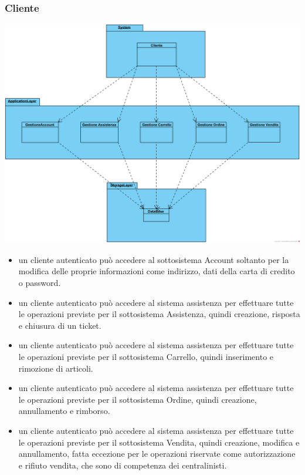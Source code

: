 \documentclass[12pt,a4paper]{article}
\begin{document}
\newpage

\subsubsection{Cliente}
\begin{center}
\includegraphics[height=0.34\textheight]{Cliente}
\end{center}
\begin{itemize}
\item un cliente autenticato può accedere al sottosistema Account soltanto per la modifica delle proprie informazioni come indirizzo, dati della carta di credito o password.
\item un cliente autenticato può accedere al sistema assistenza per effettuare tutte le operazioni previste per il sottosistema Assistenza, quindi creazione, risposta e chiusura di un ticket.
\item un cliente autenticato può accedere al sistema assistenza per effettuare tutte le operazioni previste per il sottosistema Carrello, quindi inserimento e rimozione di articoli.
\item un cliente autenticato può accedere al sistema assistenza per effettuare tutte le operazioni previste per il sottosistema Ordine, quindi creazione, annullamento e rimborso.
\item un cliente autenticato può accedere al sistema assistenza per effettuare tutte le operazioni previste per il sottosistema Vendita, quindi creazione, modifica e annullamento, fatta eccezione per le operazioni riservate come autorizzazione e rifiuto vendita, che sono di competenza dei centralinisti. 
\end{itemize}
\end{document}
